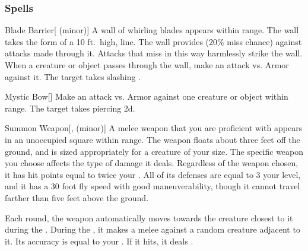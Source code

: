\subsubsection{Spells}


\lowercase{\hypertarget{spell:Blade Barrier}{}}\label{spell:Blade Barrier}
\begin{apability}[\nth{1}]{\hypertarget{spell:Blade Barrier}{Blade Barrier}}[ (minor)]
A wall of whirling blades appears within \rngmed range.
The wall takes the form of a 10 ft.\ high, \arealarge line.
The wall provides  (20\% miss chance) against attacks made through it.
Attacks that miss in this way harmlessly strike the wall.
When a creature or object passes through the wall, make an attack vs. Armor against it.
\hit The target takes slashing .
\end{apability}
\vspace{0.25em}



\lowercase{\hypertarget{spell:Mystic Bow}{}}\label{spell:Mystic Bow}
\begin{apability}[\nth{1}]{\hypertarget{spell:Mystic Bow}{Mystic Bow}}[]
Make an attack vs. Armor against one creature or object within \rngmed range.
\hit The target takes piercing  \plus2d.
\end{apability}
\vspace{0.25em}



\lowercase{\hypertarget{spell:Summon Weapon}{}}\label{spell:Summon Weapon}
\begin{apability}[\nth{1}]{\hypertarget{spell:Summon Weapon}{Summon Weapon}}[,  (minor)]
A melee weapon that you are proficient with appears in an unoccupied square within \rngmed range.
The weapon floats about three feet off the ground, and is sized appropriately for a creature of your size.
The specific weapon you choose affects the type of damage it deals.
Regardless of the weapon chosen, it has hit points equal to twice your .
All of its defenses are equal to 3 \add your level, and it has a 30 foot fly speed with good maneuverability, though it cannot travel farther than five feet above the ground.

Each round, the weapon automatically moves towards the creature closest to it during the .
During the , it makes a melee  against a random creature adjacent to it.
Its accuracy is equal to your .
If it hits, it deals .
\end{apability}
\vspace{0.25em}



